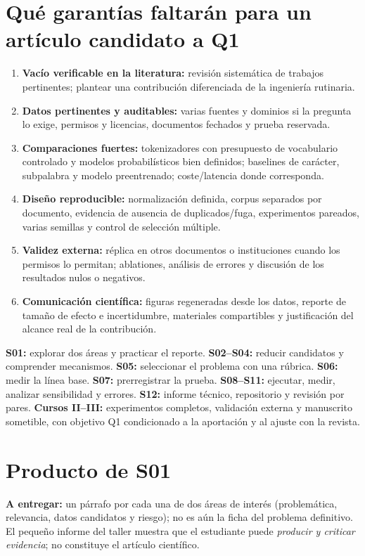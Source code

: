 \section*{Qué garantías faltarán para un artículo candidato a Q1}
\begin{enumerate}
\item \textbf{Vacío verificable en la literatura:} revisión sistemática de trabajos
pertinentes; plantear una contribución diferenciada de la ingeniería rutinaria.
\item \textbf{Datos pertinentes y auditables:} varias fuentes y dominios si la
pregunta lo exige, permisos y licencias, documentos fechados y prueba reservada.
\item \textbf{Comparaciones fuertes:} tokenizadores con presupuesto de vocabulario
controlado y modelos probabilísticos bien definidos; baselines de carácter,
subpalabra y modelo preentrenado; coste/latencia donde corresponda.
\item \textbf{Diseño reproducible:} normalización definida, corpus separados por
documento, evidencia de ausencia de duplicados/fuga, experimentos pareados,
varias semillas y control de selección múltiple.
\item \textbf{Validez externa:} réplica en otros documentos o instituciones
cuando los permisos lo permitan; ablationes, análisis de errores y discusión
de los resultados nulos o negativos.
\item \textbf{Comunicación científica:} figuras regeneradas desde los datos,
reporte de tamaño de efecto e incertidumbre, materiales compartibles y
justificación del alcance real de la contribución.
\end{enumerate}
\begin{puente}
\textbf{S01:} explorar dos áreas y practicar el reporte. \textbf{S02--S04:}
reducir candidatos y comprender mecanismos. \textbf{S05:} seleccionar el
problema con una rúbrica. \textbf{S06:} medir la línea base. \textbf{S07:}
prerregistrar la prueba. \textbf{S08--S11:} ejecutar, medir, analizar
sensibilidad y errores. \textbf{S12:} informe técnico, repositorio y revisión
por pares. \textbf{Cursos II--III:} experimentos completos, validación
externa y manuscrito sometible, con objetivo Q1 condicionado a la
aportación y al ajuste con la revista.
\end{puente}
\section*{Producto de S01}
\textbf{A entregar:} un párrafo por cada una de dos áreas de interés
(problemática, relevancia, datos candidatos y riesgo); no es aún la ficha
del problema definitivo. El pequeño informe del taller muestra que el
estudiante puede \emph{producir y criticar evidencia}; no constituye el
artículo científico.

